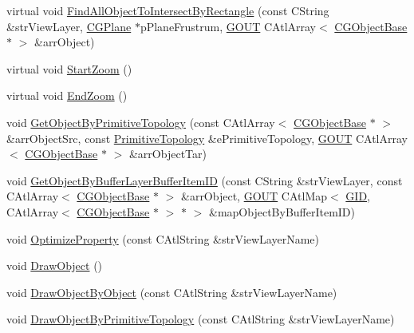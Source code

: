 \begin{DoxyCompactItemize}
\item 
virtual void \hyperlink{class_c_g3_d_view_ae6a4d739c7ec3d135cfcdda284a918f7}{Find\+All\+Object\+To\+Intersect\+By\+Rectangle} (const C\+String \&str\+View\+Layer, \hyperlink{class_c_g_plane}{C\+G\+Plane} $\ast$p\+Plane\+Frustrum, \hyperlink{_g_types_8h_a0858ec221262e635612871d70ca233ad}{G\+O\+U\+T} C\+Atl\+Array$<$ \hyperlink{class_c_g_object_base}{C\+G\+Object\+Base} $\ast$ $>$ \&arr\+Object)
\item 
virtual void \hyperlink{class_c_g3_d_view_ab02270092cf4823b2f0ee2ff7ab705fa}{Start\+Zoom} ()
\item 
virtual void \hyperlink{class_c_g3_d_view_a808a0626bd17033b5c4073db7a6e5649}{End\+Zoom} ()
\item 
void \hyperlink{class_c_g3_d_view_a768a48fb812358e434fe69ef673e3aa7}{Get\+Object\+By\+Primitive\+Topology} (const C\+Atl\+Array$<$ \hyperlink{class_c_g_object_base}{C\+G\+Object\+Base} $\ast$ $>$ \&arr\+Object\+Src, const \hyperlink{_g_types_8h_a940e3da6a9b57aae3de0b050e2a7af5e}{Primitive\+Topology} \&e\+Primitive\+Topology, \hyperlink{_g_types_8h_a0858ec221262e635612871d70ca233ad}{G\+O\+U\+T} C\+Atl\+Array$<$ \hyperlink{class_c_g_object_base}{C\+G\+Object\+Base} $\ast$ $>$ \&arr\+Object\+Tar)
\item 
void \hyperlink{class_c_g3_d_view_a849c61b4aafdaab36d5cadb22919a7a4}{Get\+Object\+By\+Buffer\+Layer\+Buffer\+Item\+I\+D} (const C\+String \&str\+View\+Layer, const C\+Atl\+Array$<$ \hyperlink{class_c_g_object_base}{C\+G\+Object\+Base} $\ast$ $>$ \&arr\+Object, \hyperlink{_g_types_8h_a0858ec221262e635612871d70ca233ad}{G\+O\+U\+T} C\+Atl\+Map$<$ \hyperlink{_g_types_8h_a5b96ecb16d8e437977d12cd40aa6f6d8}{G\+I\+D}, C\+Atl\+Array$<$ \hyperlink{class_c_g_object_base}{C\+G\+Object\+Base} $\ast$ $>$ $\ast$ $>$ \&map\+Object\+By\+Buffer\+Item\+I\+D)
\item 
void \hyperlink{class_c_g3_d_view_a4fa8f4ca2d15b1efe7e1f8cada774ae8}{Optimize\+Property} (const C\+Atl\+String \&str\+View\+Layer\+Name)
\item 
void \hyperlink{class_c_g3_d_view_a7755c4e350ad340e013f1345f5b4c89a}{Draw\+Object} ()
\item 
void \hyperlink{class_c_g3_d_view_ab8101a92ca52e0c1c5faabe851c2cba6}{Draw\+Object\+By\+Object} (const C\+Atl\+String \&str\+View\+Layer\+Name)
\item 
void \hyperlink{class_c_g3_d_view_a2e91ea875abc83c89b65dc3a1804c194}{Draw\+Object\+By\+Primitive\+Topology} (const C\+Atl\+String \&str\+View\+Layer\+Name)
\item 

\end{DoxyCompactItemize}
